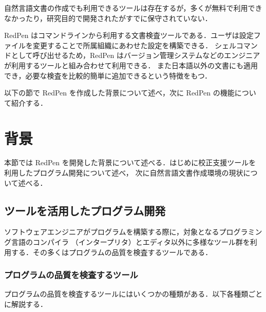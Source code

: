 \documentclass[a4paper, 10pt]{jarticle}
\begin{document}
自然言語文書の作成でも利用できるツールは存在するが，多くが無料で利用できなかったり，研究目的で開発されたがすでに保守されていない．

RedPen はコマンドラインから利用する文書検査ツールである．ユーザは設定ファイルを変更することで所属組織にあわせた設定を構築できる．
シェルコマンドとして呼び出せるため，RedPen はバージョン管理システムなどのエンジニアが利用するツールと組み合わせて利用できる．
また日本語以外の文書にも適用でき，必要な検査を比較的簡単に追加できるという特徴をもつ．

以下の節で RedPen を作成した背景について述べ，次に RedPen の機能について紹介する．

\section{背景}
本節では RedPen を開発した背景について述べる．はじめに校正支援ツールを利用したプログラム開発について述べ，
次に自然言語文書作成環境の現状について述べる．

\subsection{ツールを活用したプログラム開発}
ソフトウェアエンジニアがプログラムを構築する際に，対象となるプログラミング言語のコンパイラ
（インタープリタ）とエディタ以外に多様なツール群を利用する．その多くはプログラムの品質を検査するツールである．

\subsubsection{プログラムの品質を検査するツール}
プログラムの品質を検査するツールにはいくつかの種類がある．以下各種類ごとに解説する．
\end{document}
